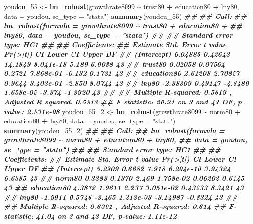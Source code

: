 \documentclass[
]{book}
\newenvironment{Shaded}{\begin{snugshade}}{\end{snugshade}}
\newcommand{\AttributeTok}[1]{\textcolor[rgb]{0.13,0.29,0.53}{#1}}
\newcommand{\DocumentationTok}[1]{\textcolor[rgb]{0.56,0.35,0.01}{\textbf{\textit{#1}}}}
\newcommand{\FunctionTok}[1]{\textcolor[rgb]{0.13,0.29,0.53}{\textbf{#1}}}
\newcommand{\NormalTok}[1]{#1}
\newcommand{\OtherTok}[1]{\textcolor[rgb]{0.56,0.35,0.01}{#1}}
\newcommand{\SpecialCharTok}[1]{\textcolor[rgb]{0.81,0.36,0.00}{\textbf{#1}}}
\newcommand{\StringTok}[1]{\textcolor[rgb]{0.31,0.60,0.02}{#1}}
\begin{document}
\begin{Shaded}
\begin{Highlighting}[]
\NormalTok{youdou\_55 }\OtherTok{\textless{}{-}} \FunctionTok{lm\_robust}\NormalTok{(growthrate8099 }\SpecialCharTok{\textasciitilde{}}\NormalTok{ trust80 }\SpecialCharTok{+}\NormalTok{ education80 }\SpecialCharTok{+}\NormalTok{ lny80, }\AttributeTok{data =}\NormalTok{ youdou, }\AttributeTok{se\_type =} \StringTok{"stata"}\NormalTok{)}
\FunctionTok{summary}\NormalTok{(youdou\_55)}
\DocumentationTok{\#\# }
\DocumentationTok{\#\# Call:}
\DocumentationTok{\#\# lm\_robust(formula = growthrate8099 \textasciitilde{} trust80 + education80 + }
\DocumentationTok{\#\#     lny80, data = youdou, se\_type = "stata")}
\DocumentationTok{\#\# }
\DocumentationTok{\#\# Standard error type:  HC1 }
\DocumentationTok{\#\# }
\DocumentationTok{\#\# Coefficients:}
\DocumentationTok{\#\#             Estimate Std. Error t value  Pr(\textgreater{}|t|) CI Lower CI Upper DF}
\DocumentationTok{\#\# (Intercept)  6.04885    0.42643 14.1849 8.041e{-}18    5.189   6.9088 43}
\DocumentationTok{\#\# trust80      0.02058    0.07564  0.2721 7.868e{-}01   {-}0.132   0.1731 43}
\DocumentationTok{\#\# education80  2.61208    2.70857  0.9644 3.403e{-}01   {-}2.850   8.0744 43}
\DocumentationTok{\#\# lny80       {-}2.38309    0.49147 {-}4.8489 1.658e{-}05   {-}3.374  {-}1.3920 43}
\DocumentationTok{\#\# }
\DocumentationTok{\#\# Multiple R{-}squared:  0.5619 ,    Adjusted R{-}squared:  0.5313 }
\DocumentationTok{\#\# F{-}statistic: 20.21 on 3 and 43 DF,  p{-}value: 2.531e{-}08}
\NormalTok{youdou\_55\_2 }\OtherTok{\textless{}{-}} \FunctionTok{lm\_robust}\NormalTok{(growthrate8099 }\SpecialCharTok{\textasciitilde{}}\NormalTok{ norm80 }\SpecialCharTok{+}\NormalTok{ education80 }\SpecialCharTok{+}\NormalTok{ lny80, }\AttributeTok{data =}\NormalTok{ youdou, }\AttributeTok{se\_type =} \StringTok{"stata"}\NormalTok{)}
\FunctionTok{summary}\NormalTok{(youdou\_55\_2)}
\DocumentationTok{\#\# }
\DocumentationTok{\#\# Call:}
\DocumentationTok{\#\# lm\_robust(formula = growthrate8099 \textasciitilde{} norm80 + education80 + lny80, }
\DocumentationTok{\#\#     data = youdou, se\_type = "stata")}
\DocumentationTok{\#\# }
\DocumentationTok{\#\# Standard error type:  HC1 }
\DocumentationTok{\#\# }
\DocumentationTok{\#\# Coefficients:}
\DocumentationTok{\#\#             Estimate Std. Error t value  Pr(\textgreater{}|t|) CI Lower CI Upper DF}
\DocumentationTok{\#\# (Intercept)   5.2909     0.6682   7.918 6.204e{-}10  3.94324   6.6385 43}
\DocumentationTok{\#\# norm80        0.3383     0.1370   2.469 1.758e{-}02  0.06202   0.6145 43}
\DocumentationTok{\#\# education80   4.3872     1.9611   2.237 3.051e{-}02  0.43233   8.3421 43}
\DocumentationTok{\#\# lny80        {-}1.9911     0.5746  {-}3.465 1.213e{-}03 {-}3.14987  {-}0.8324 43}
\DocumentationTok{\#\# }
\DocumentationTok{\#\# Multiple R{-}squared:  0.6391 ,    Adjusted R{-}squared:  0.614 }
\DocumentationTok{\#\# F{-}statistic: 41.04 on 3 and 43 DF,  p{-}value: 1.11e{-}12}
\end{Highlighting}
\end{Shaded}
\end{document}
